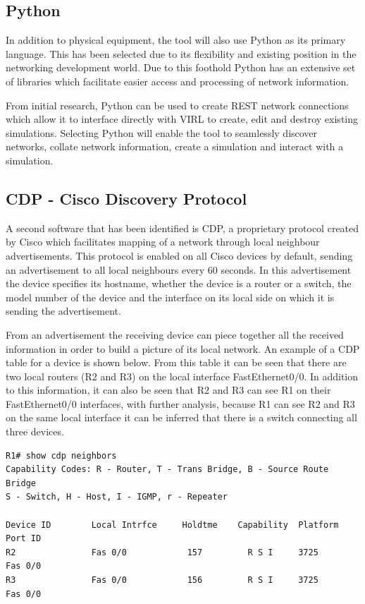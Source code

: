 \documentclass[11pt]{report}
\begin{document}
\subsection{Python}

In addition to physical equipment, the tool will also use Python as its primary language. This has been selected due to its flexibility and existing position in the networking development world. Due to this foothold Python has an extensive set of libraries which facilitate easier access and processing of network information.

From initial research, Python can be used to create REST network connections which allow it to interface directly with VIRL to create, edit and destroy existing simulations. Selecting Python will enable the tool to seamlessly discover networks, collate network information, create a simulation and interact with a simulation.

\subsection{CDP - Cisco Discovery Protocol}

A second software that has been identified is CDP, a proprietary protocol created by Cisco which facilitates mapping of a network through local neighbour advertisements. This protocol is enabled on all Cisco devices by default, sending an advertisement to all local neighbours every 60 seconds. In this advertisement the device specifies its hostname, whether the device is a router or a switch, the model number of the device and the interface on its local side on which it is sending the advertisement. 

From an advertisement the receiving device can piece together all the received information in order to build a picture of its local network. An example of a CDP table for a device is shown below. From this table it can be seen that there are two local routers (R2 and R3) on the local interface FastEthernet0/0. In addition to this information, it can also be seen that R2 and R3 can see R1 on their FastEthernet0/0 interfaces, with further analysis, because R1 can see R2 and R3 on the same local interface it can be inferred that there is a switch connecting all three devices.

\begin{lstlisting}
R1# show cdp neighbors
Capability Codes: R - Router, T - Trans Bridge, B - Source Route Bridge
S - Switch, H - Host, I - IGMP, r - Repeater

Device ID        Local Intrfce     Holdtme    Capability  Platform  Port ID
R2               Fas 0/0            157         R S I     3725      Fas 0/0
R3               Fas 0/0            156         R S I     3725      Fas 0/0
\end{lstlisting}
\end{document}
